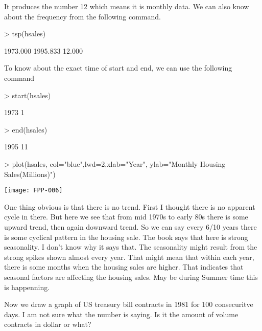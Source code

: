 \documentclass{article}
\begin{document}
It produces the number 12 which means it is monthly data. We can also know
about the frequency from the following command.

\begin{Schunk}
\begin{Sinput}
> tsp(hsales)
\end{Sinput}
\begin{Soutput}
[1] 1973.000 1995.833   12.000
\end{Soutput}
\end{Schunk}

To know about the exact time of start and end, we can use the following command

\begin{Schunk}
\begin{Sinput}
> start(hsales)
\end{Sinput}
\begin{Soutput}
[1] 1973    1
\end{Soutput}
\begin{Sinput}
> end(hsales)
\end{Sinput}
\begin{Soutput}
[1] 1995   11
\end{Soutput}
\end{Schunk}


 
 
 
\begin{Schunk}
\begin{Sinput}
> plot(hsales, col="blue",lwd=2,xlab="Year", ylab="Monthly Housing Sales(Millions)")
\end{Sinput}
\end{Schunk}
\texttt{[image: FPP-006]}

One thing obvious is that there is no trend. First I thought there is no apparent cycle in there. But here we see that from mid 1970s to early 80s there is some upward trend, then again downward trend. So we can say every 6/10 years there is some cyclical pattern in the housing sale. The book says that here is strong seasonality. I don't know why it says that. The seasonality might result from the strong spikes shown almost every year. That might mean that within each year, there is some months when the housing sales are higher. That indicates that seasonal factors are affecting the housing sales. May be during Summer time this is happenning.  

Now we draw a graph of US treasury bill contracts in 1981 for 100 consecuritve days. I am not sure what the number is saying. Is it 
the amount of volume contracts in dollar or what? 
\end{document}
